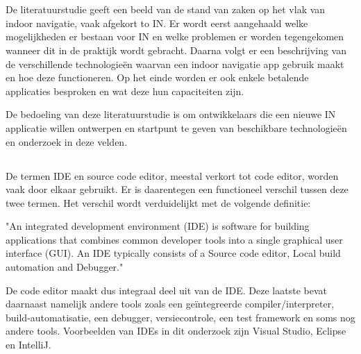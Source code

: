 \chapter{}
\label{ch:stand-van-zaken}



De literatuurstudie geeft een beeld van de stand van zaken op het vlak van indoor navigatie, vaak afgekort to IN. Er wordt eerst aangehaald welke mogelijkheden er bestaan voor IN en welke problemen er worden tegengekomen wanneer dit in de praktijk wordt gebracht. Daarna volgt er een beschrijving van de verschillende technologieën waarvan een indoor navigatie app gebruik maakt en hoe deze functioneren. Op het einde worden er ook enkele betalende applicaties besproken en wat deze hun capaciteiten zijn.

De bedoeling van deze literatuurstudie is om ontwikkelaars die een nieuwe IN applicatie willen ontwerpen en startpunt te geven van beschikbare technologieën en onderzoek in deze velden. 

\section{}
\label{sec:IDE-codeEditor}

De termen IDE en source code editor, meestal verkort tot code editor, worden vaak door elkaar gebruikt. Er is daarentegen een functioneel verschil tussen deze twee termen. Het verschil wordt verduidelijkt met de volgende definitie:

\begin{displayquote}
"An integrated development environment (IDE) is software for building applications that combines common developer tools into a single graphical user interface (GUI). An IDE typically consists of a Source code editor,  Local build automation and Debugger." \autocite{RedHat2018}
\end{displayquote}

De code editor maakt dus integraal deel uit van de IDE. Deze laatste bevat daarnaast namelijk andere tools zoals een geïntegreerde compiler/interpreter, build-automatisatie, een debugger, versiecontrole, een test framework en soms nog andere tools. Voorbeelden van IDEs in dit onderzoek zijn Visual Studio, Eclipse en IntelliJ.

